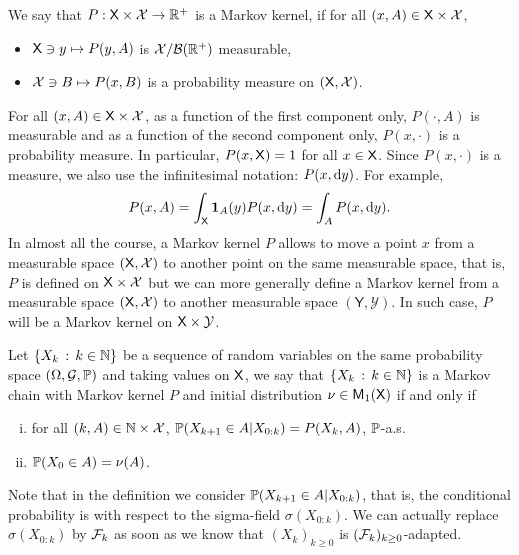 \documentclass[english,graybox,envcountchap,envcountsame,sectrefs,shortlabels]{svmono}
\theoremstyle{style}
\newcommand{\Yset}{\mathsf{Y}}
\newcommand{\Ysigma}{\mathcal{Y}}
\newcommand{\bs}{\begin{shaded}}
\newcommand{\es}{\end{shaded}}
\newcommand{\eqsp}{}
\begin{document}
\begin{definition}
We say that $P:\mathsf{X}\times\mathcal{X}\to\mathbb{R}^{+}$
is a Markov kernel, if for all $(x,A)\in\mathsf{X}\times\mathcal{X}$,
\begin{itemize}
\item $\mathsf{X}\ni y\mapsto P(y,A)$ is $\mathcal{X}/\mathcal{B}(\mathbb{R}^{+})$ measurable,
\item $\mathcal{X}\ni B\mapsto P(x,B)$ is a probability measure on $(\mathsf{X},\mathcal{X})$.
\end{itemize}
\end{definition}
For all $(x,A)\in\mathsf{X}\times\mathcal{X}$, as a function
of the first component only, $P(\cdot,A)$ is measurable and as a
function of the second component only, $P(x,\cdot)$ is a probability
measure. In particular, $P(x,\mathsf{X})=1$ for all $x\in\mathsf{X}$. Since
$P(x,\cdot)$ is a measure, we also use the infinitesimal notation:
$P(x,\mathrm{d} y)$. For example, 
$$
P(x,A)=\int_{\Xset}\indi A(y)P(x,\rmd y)=\int_{A}P(x,\rmd y)\eqsp.
$$
In almost all the course, a Markov kernel $P$ allows to move a point $x$ from a measurable space $(\mathsf{X},\mathcal{X})$ to another point on the same measurable space, that is, $P$ is defined on $\mathsf{X}\times \mathcal{X}$ but we can more generally define a Markov kernel from a measurable space $(\mathsf{X},\mathcal{X})$ to another measurable space $(\Yset,\Ysigma)$. In such case, $P$ will be a  Markov kernel on $\Xset \times \Ysigma$. 
\begin{definition}
\label{def:MarkovChain} Let $\left\{ X_{k}\,:\,k\in\mathbb{N}\right\}$
be a sequence of random variables on the same probability space $(\Omega,\mathcal{G},\mathbb{P})$
and taking values on $\mathsf{X}$, we say that $\left\{ X_{k}\,:\,k\in\mathbb{N}\right\}$
is a Markov chain with Markov kernel $P$ and initial distribution
$\nu\in\mathsf{M}_{1}(\mathsf{X})$ if and only if
\begin{enumerate}[(i)]
\item  for all $(k,A)\in\mathbb{N}\times\mathcal{X}$,  $\mathbb{P}(X_{k+1}\in A|X_{0:k})=P(X_{k},A)$,
$\mathbb{P}$-a.s.
\item $\mathbb{P}(X_{0}\in A)=\nu(A)$.
\end{enumerate}
\end{definition}
Note that in the definition we consider $\mathbb{P}(X_{k+1}\in A|X_{0:k})$,
that is, the conditional probability is with respect to the sigma-field
$\sigma(X_{0:k})$. We can actually replace $\sigma(X_{0:k})$ by
$\mathcal{F}_{k}$ as soon as we know that $(X_{k})_{k\geq0}$ is $(\mathcal{F}_{k})_{k\geq0}$-adapted.
\end{document}
